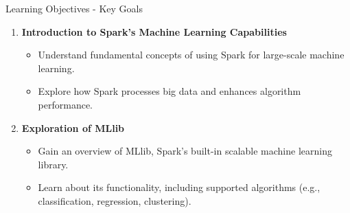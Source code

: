 \documentclass[aspectratio=169]{beamer}
\begin{document}
\begin{frame}[fragile]{Learning Objectives - Key Goals}
  \begin{enumerate}
    \item \textbf{Introduction to Spark's Machine Learning Capabilities}
    \begin{itemize}
      \item Understand fundamental concepts of using Spark for large-scale machine learning.
      \item Explore how Spark processes big data and enhances algorithm performance.
    \end{itemize}

    \item \textbf{Exploration of MLlib}
    \begin{itemize}
      \item Gain an overview of MLlib, Spark's built-in scalable machine learning library.
      \item Learn about its functionality, including supported algorithms (e.g., classification, regression, clustering).
    \end{itemize}
  \end{enumerate}
\end{frame}
\end{document}
